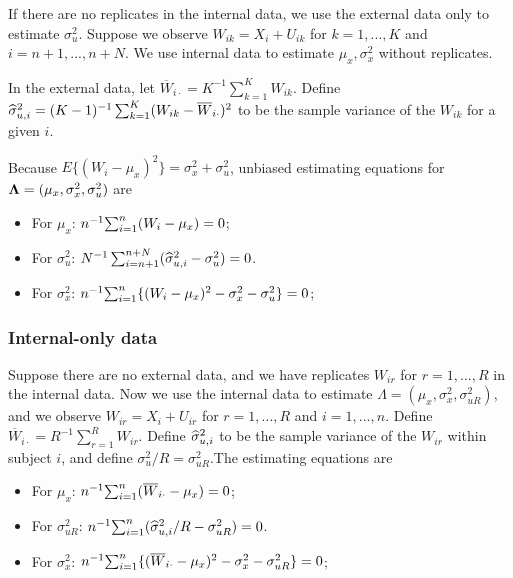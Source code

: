 \documentclass[15 pt,]{article}
\begin{document}
If there are no replicates in the internal data, we use the external
data only to estimate \(\sigma_u^2\). Suppose we observe
\(W_{ik} = X_i + U_{ik}\) for \(k=1,...,K\) and \(i=n+1,...,n+N\). We
use internal data to estimate \(\mu_x,\sigma^2_x\) without replicates.

In the external data, let
\(\overline{W}_{i\cdot} = K^{-1} \sum_{k=1}^{K}W_{ik}\). Define
\(\widehat{\sigma}^2_{u,i} = (K-1)^{-1} \sum_{k=1}^K (W_{ik} - \overline{W}_{i\cdot})^2\)
to be the sample variance of the \(W_{ik}\) for a given \(i\).

Because \(E\{ (W_{i} - \mu_x)^2\} = \sigma_x^2 + \sigma_u^2\), unbiased
estimating equations for \(\mbox{\boldmath $\Lambda$}=(\mu_x,\sigma^2_x,\sigma^2_u)\) are

\begin{itemize}
\item
  For \(\mu_x\): \(n^{-1} \hbox{$\sum_{i=1}^{n}$} (W_i - \mu_x)=0\);
\item
  For \(\sigma_u^2\):
  \(N^{-1}\sum_{i=n+1}^{n+N} (\widehat{\sigma}^2_{u,i} - \sigma_u^2)=0\).
\item
  For \(\sigma_x^2\):
  \(n^{-1} \hbox{$\sum_{i=1}^{n}$} \{ (W_i - \mu_x)^2 - \sigma_x^2 - \sigma_u^2\}=0\);
\end{itemize}

\subsubsection{Internal-only data}\label{internal-only-data}

Suppose there are no external data, and we have replicates \(W_{ir}\)
for \(r= 1,...,R\) in the internal data. Now we use the internal data to
estimate \(\Lambda =(\mu_x,\sigma_x^2,\sigma_{uR}^2)\), and we observe
\(W_{ir} = X_i + U_{ir}\) for \(r=1,...,R\) and \(i=1,...,n\). Define
\(\overline{W}_{i\cdot} = R^{-1}\sum_{r=1}^R W_{ir}\). Define
\(\widehat{\sigma}^2_{u,i}\) to be the sample variance of the \(W_{ir}\)
within subject \(i\), and define \(\sigma_u^2/R = \sigma^2_{uR}\).The
estimating equations are

\begin{itemize}
\item
  For \(\mu_x\): \(n^{-1} \hbox{$\sum_{i=1}^{n}$} (\overline{W}_{i\cdot} - \mu_x)=0\);
\item
  For \(\sigma_{uR}^2\):
  \(n^{-1}\hbox{$\sum_{i=1}^{n}$} (\widehat{\sigma}^2_{u,i}/R - \sigma_{uR}^2)=0\).
\item
  For \(\sigma_x^2\):
  \(n^{-1} \hbox{$\sum_{i=1}^{n}$} \{ (\overline{W}_{i\cdot} - \mu_x)^2 - \sigma_x^2 - \sigma_{uR}^2\}=0\);
\end{itemize}
\end{document}
